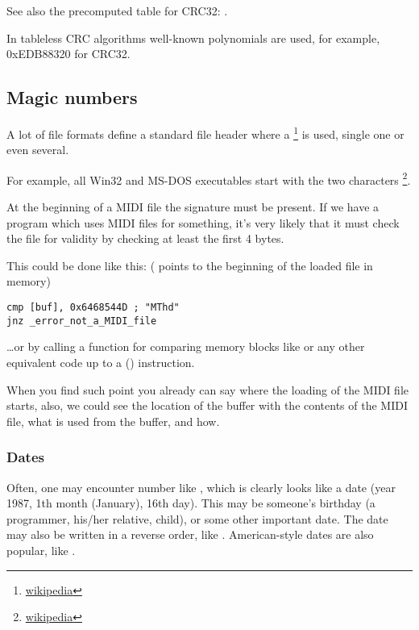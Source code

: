 See also the precomputed table for CRC32: .

In tableless CRC algorithms well-known polynomials are used, for example, 0xEDB88320 for CRC32.

\subsection{Magic numbers}
\label{magic_numbers}

\newcommand{\FNURLMAGIC}{\footnote{\href{http://go.yurichev.com/17112}{wikipedia}}}

A lot of file formats define a standard file header where a \FNURLMAGIC{} is used, single one or even several.


For example, all Win32 and MS-DOS executables start with the two characters \footnote{\href{http://go.yurichev.com/17113}{wikipedia}}.


At the beginning of a MIDI file the  signature must be present. 
If we have a program which uses MIDI files for something,
it's very likely that it must check the file for validity by checking at least the first 4 bytes.

This could be done like this:
( points to the beginning of the loaded file in memory)

\begin{lstlisting}[style=customasm]
cmp [buf], 0x6468544D ; "MThd"
jnz _error_not_a_MIDI_file
\end{lstlisting}


\dots or by calling a function for comparing memory blocks like  or any other equivalent code
up to a  () instruction.

When you find such point you already can say where the loading of the MIDI file starts,
also, we could see the location
of the buffer with the contents of the MIDI file, what is used from the buffer, and how.

\subsubsection{Dates}


Often, one may encounter number like , which is clearly looks like a date (year 1987, 1th month (January), 16th day).
This may be someone's birthday (a programmer, his/her relative, child), or some other important date.
The date may also be written in a reverse order, like .
American-style dates are also popular, like .

